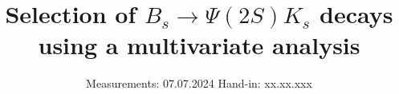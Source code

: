 

\subject{V\_LHCbMVA}
\title{Selection of $B_s \rightarrow \Psi(2S)K_s$ decays using a multivariate analysis}
\date{%
  Measurements: 07.07.2024
  \hspace{3em}
  Hand-in: xx.xx.xxx
}



\maketitle
\thispagestyle{empty}
\tableofcontents
\newpage






\printbibliography{}


